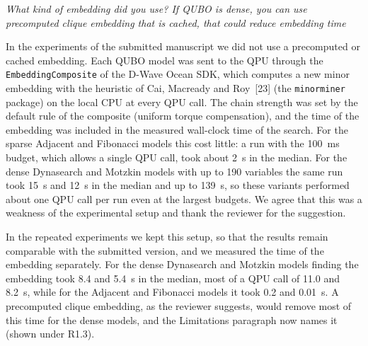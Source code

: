 \documentclass[12pt]{article}
\newenvironment{rc}[1]{\par\medskip\noindent\itshape\renewcommand{\emph}[1]{\textbf{##1}}\ignorespaces}{\par}
\newcommand{\answer}[1]{\par\smallskip\noindent #1\par}
\begin{document}
\begin{rc}{R1.4 --- Embedding}
What kind of embedding did you use? If QUBO is dense, you can use precomputed clique embedding that is cached, that could reduce embedding time
\end{rc}
\answer{In the experiments of the submitted manuscript we did not use a precomputed or cached embedding. Each QUBO model was sent to the QPU through the \texttt{EmbeddingComposite} of the D-Wave Ocean SDK, which computes a new minor embedding with the heuristic of Cai, Macready and Roy~[23] (the \texttt{minorminer} package) on the local CPU at every QPU call. The chain strength was set by the default rule of the composite (uniform torque compensation), and the time of the embedding was included in the measured wall-clock time of the search. For the sparse Adjacent and Fibonacci models this cost little: a run with the 100~ms budget, which allows a single QPU call, took about 2~s in the median. For the dense Dynasearch and Motzkin models with up to 190 variables the same run took 15~s and 12~s in the median and up to 139~s, so these variants performed about one QPU call per run even at the largest budgets. We agree that this was a weakness of the experimental setup and thank the reviewer for the suggestion.}
In the repeated experiments we kept this setup, so that the results remain comparable with the submitted version, and we measured the time of the embedding separately. For the dense Dynasearch and Motzkin models finding the embedding took 8.4 and 5.4~s in the median, most of a QPU call of 11.0 and 8.2~s, while for the Adjacent and Fibonacci models it took 0.2 and 0.01~s. A precomputed clique embedding, as the reviewer suggests, would remove most of this time for the dense models, and the Limitations paragraph now names it (shown under R1.3).
\end{document}
